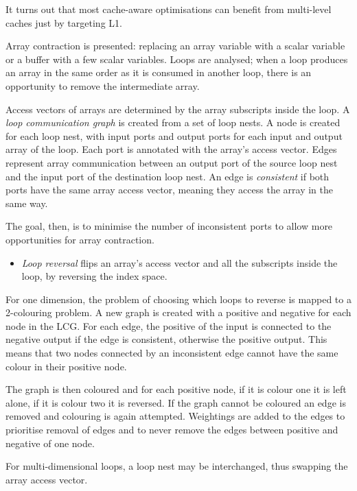 It turns out that most cache-aware optimisations can benefit from multi-level caches just by targeting L1.

Array contraction is presented: replacing an array variable with a scalar variable or a buffer with a few scalar variables.
Loops are analysed; when a loop produces an array in the same order as it is consumed in another loop, there is an opportunity to
remove the intermediate array.

Access vectors of arrays are determined by the array subscripts inside the loop.
A \emph{loop communication graph} is created from a set of loop nests. A node is created for each loop nest, with input ports and output ports for each input and output array of the loop. Each port is annotated with the array's access vector.
Edges represent array communication between an output port of the source loop nest and the input port of the destination loop nest.
An edge is \emph{consistent} if both ports have the same array access vector, meaning they access the array in the same way.

The goal, then, is to minimise the number of inconsistent ports to allow more opportunities for array contraction.
\begin{itemize}
\item
\emph{Loop reversal} flips an array's access vector and all the subscripts inside the loop, by reversing the index space.
\end{itemize}
For one dimension, the problem of choosing which loops to reverse is mapped to a 2-colouring problem.
A new graph is created with a positive and negative for each node in the LCG. For each edge, the positive of the input is connected to the negative output if the edge is consistent, otherwise the positive output.
This means that two nodes connected by an inconsistent edge cannot have the same colour in their positive node.

The graph is then coloured and for each positive node, if it is colour one it is left alone, if it is colour two it is reversed.
If the graph cannot be coloured an edge is removed and colouring is again attempted.
Weightings are added to the edges to prioritise removal of edges and to never remove the edges between positive and negative of one node.

For multi-dimensional loops, a loop nest may be interchanged, thus swapping the array access vector.

